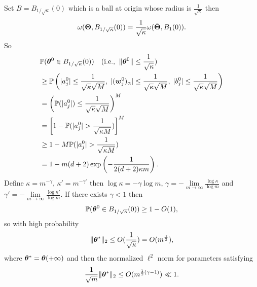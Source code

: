 \documentclass{article}
\begin{document}
\begin{rmk}
    Set $B=B_{1/\sqrt{\kappa}}(0)$ which is a ball at origin whose radius is $\frac{1}{\sqrt{\kappa}}$ then
    \begin{equation}
        \omega(\bm{\Theta}, B_{1/\sqrt{\kappa}}(0))=\frac{1}{\sqrt{\kappa}}\omega(\tilde{\bm{\Theta}}, B_1(0)).
    \end{equation}
    So
    \begin{align}
         & \mathbb{P}(\bm{\theta}^0\in B_{1/\sqrt{\kappa}}(0)) \quad (\mathrm{i.e., }\;\;\lVert\bm{\theta}^0\rVert\leq \frac{1}{\sqrt{\kappa}})                                                          \\
         & \geq \mathbb{P}\left(|a_j^0|\leq \frac{1}{\sqrt{\kappa}\sqrt{M}},\; |(\bm{w}_j^0)_\alpha|\leq \frac{1}{\sqrt{\kappa}\sqrt{M}},\; |b_j^0|\leq \frac{1}{\sqrt{\kappa}\sqrt{M}}\right) \\
         & = \left(\mathbb{P}(\lvert a^0_j\rvert)\leq \frac{1}{\sqrt{\kappa}\sqrt{M}}\right)^M                                                                                                     \\
         & = \left[1 - \mathbb{P}(\lvert a_j^0\rvert>\frac{1}{\sqrt{\kappa M}})\right]^M                                                                                                           \\
         & \geq 1 - M\mathbb{P}(\lvert a_j^0\rvert>\frac{1}{\sqrt{\kappa M}})                                                                                                                      \\
         & = 1 - m(d+2)\exp\left(-\frac{1}{2(d+2)\kappa m}\right).
    \end{align}
    Define $\kappa = m^{-\gamma}$, $\kappa'=m^{-\gamma'}$ then $\log \kappa=-\gamma\log m$, $\gamma=-\lim\limits_{m\to\infty}\frac{\log \kappa}{\log m}$ and $\gamma'=-\lim\limits_{m\to\infty}\frac{\log \kappa'}{\log m}$. If there exists $\gamma < 1$ then
    \begin{equation}
        \mathbb{P}(\bm{\theta}^0\in B_{1/\sqrt{\kappa}}(0)) \geq 1 - O(1),
    \end{equation}
    so with high probability
    \begin{equation}
        \lVert\bm{\theta}^*\rVert_2\leq O(\frac{1}{\sqrt{\kappa}}) = O(m^{\frac{\gamma}{2}}),
    \end{equation}
    where $\bm{\theta}^*=\bm{\theta}(+\infty)$ and then the normalized $\ell^2$ norm for parameters satisfying
    \begin{equation}
        \frac{1}{\sqrt{m}}\lVert\bm{\theta}^*\rVert_2\leq O(m^{\frac{1}{2}(\gamma-1)}) \ll 1.
    \end{equation}
\end{rmk}
\end{document}

